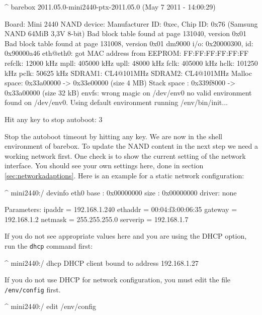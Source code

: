 \begin{ptxshell}[escapechar=|]{^}
barebox 2011.05.0-mini2440-ptx-2011.05.0 (May 7 2011 - 14:00:29)

Board: Mini 2440
NAND device: Manufacturer ID: 0xec, Chip ID: 0x76 (Samsung NAND 64MiB 3,3V 8-bit)
Bad block table found at page 131040, version 0x01
Bad block table found at page 131008, version 0x01
dm9000 i/o: 0x20000300, id: 0x90000a46
eth@eth0: got MAC address from EEPROM: FF:FF:FF:FF:FF:FF
refclk:    12000 kHz
mpll:     405000 kHz
upll:      48000 kHz
fclk:     405000 kHz
hclk:     101250 kHz
pclk:      50625 kHz
SDRAM1:   CL4@101MHz
SDRAM2:   CL4@101MHz
Malloc space: 0x33a00000 -> 0x33e00000 (size  4 MB)
Stack space : 0x339f8000 -> 0x33a00000 (size 32 kB)
envfs: wrong magic on /dev/env0
no valid environment found on /dev/env0. Using default environment
running /env/bin/init...

Hit any key to stop autoboot:  3
\end{ptxshell}

Stop the autoboot timeout by hitting any key. We are now in the shell
environment of barebox. To update the NAND content in the next step we need
a working network first. One check is to show the current setting of the
network interface. You should see your own settings here, done in section
\ref{sec:networkadaptions}. Here is an example for a static network configuration:

\begin{ptxshell}[escapechar=|]{^}
mini2440:/ devinfo eth0
base  : 0x00000000
size  : 0x00000000
driver: none

Parameters:
          ipaddr = 192.168.1.240
         ethaddr = 00:04:f3:00:06:35
         gateway = 192.168.1.2
         netmask = 255.255.255.0
        serverip = 192.168.1.7
\end{ptxshell}

If you do not see appropriate values here and you are using the DHCP option, run
the \texttt{dhcp} command first:

\begin{ptxshell}[escapechar=|]{^}
mini2440:/ dhcp
DHCP client bound to address 192.168.1.27
\end{ptxshell}

If you do not use DHCP for network configuration, you must edit the file
\texttt{/env/config} first.

\begin{ptxshell}[escapechar=|]{^}
mini2440:/ edit /env/config
\end{ptxshell}

